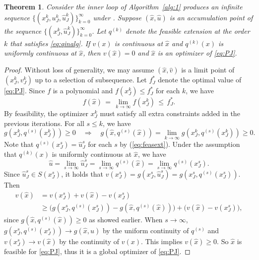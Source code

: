 \documentclass{amsart}
\newcommand{\reff}[1]{(\ref{#1})}
\newtheorem{theorem}{Theorem}[section]
\theoremstyle{plain}
\numberwithin{equation}{section}
\begin{document}
		\begin{theorem}\label{thm:asym_conv}
		Consider the inner loop of Algorithm~\ref{alg:1} produces an infinite sequence
			$\{(x_J^k, u_J^k,\hat{u}_J^k)\}_{k=0}^{\infty}$ under .
		Suppose $(\hat{x}, \hat{u})$ is an accumulation point of the 
			sequence $\{(x_J^k,\hat{u}_J^k)\}_{k=0}^{\infty}$.
		Let $q^{(k)}$ denote the feasible extension at the order $k$ that satisfies \eqref{eq:qinalg}.
		If $v(x)$ is continuous at $\hat{x}$ and $q^{(k)}(x)$ is uniformly continuous at $\hat{x}$,
			then $v(\hat{x}) = 0$ and $\hat{x}$ is an optimizer of \eqref{eq:PJ}.
		\end{theorem}
		\begin{proof}
			Without loss of generality, we may assume $(\hat{x}, \hat{v})$ is a limit point of $(x_J^k, v_J^k)$ 
			up to a selection of subsequence.
			Let $f_J^*$ denote the optimal value of \eqref{eq:PJ}.
			Since $f$ is a polynomial and $f(x_J^k)\le f_J^*$ for each $k$, we have
			\[
			f(\hat{x})\, =\, \lim_{k\to \infty} f(x_J^k) \, \le\, f_J^*.
			\]
			By feasibility, the optimizer $x_J^k$ must satisfy all extra constraints added in the previous iterations. 
			For all $s\le k$, we have
			\[ g(x_J^{k},q^{(s)}(x_J^{k}))\ge 0\quad \Rightarrow
			\quad g(\hat{x}, q^{(s)}(\hat{x})) = \lim_{k\to \infty}g(x_J^{k},q^{(s)}(x_J^{k}))\ge 0. \]
			Note that $q^{(s)}(x_J^s) = \hat{u}_J^s$ for each $s$ by \reff{eq:feasext}.
			Under the assumption that $q^{(k)}(x)$ is uniformly continuous at $\hat{x}$, we have
			\[ 
			\hat{u} = \lim_{s\to \infty} \hat{u}_J^{s} = 
			\lim_{s\to \infty} q^{(s)}(\hat{x}) = 
			\lim_{s\to\infty}q^{(s)}(x_J^{s}).
			\]
			Since $\hat{u}_J^s\in S(x_J^s)$, it holds that 
			$v(x_J^s) = g(x_J^s, \hat{u}_J^s) = g(x_J^s, q^{(s)}(x_J^s))$. Then
			\[
			\begin{aligned}
				v(\hat{x}) &= v(x_J^{s})+v(\hat{x})-v(x_J^{s})\\
				& \ge \big( g(x_J^{s},q^{(s)}(x_J^s))-g(\hat{x},q^{(s)}(\hat{x}))\big)+\big(v(\hat{x})-v(x_J^{s})\big),
			\end{aligned}
			\]
			since $g(\hat{x}, q^{(s)}(\hat{x}))\ge 0$ as showed earlier.
			When $s\to \infty$, $g(x_J^{s},q^{(s)}(x_J^s))\to g(\hat{x},\hat{u})$ by the uniform continuity 
			of $q^{(s)}$ and $v(x_J^{s})\to v(\hat{x})$ by the continuity of $v(x)$.
			This implies $v(\hat{x})\ge 0$. 
			So $\hat{x}$ is feasible for \eqref{eq:PJ}, thus it is a global optimizer of \eqref{eq:PJ}.
		\end{proof}	
		
\end{document}
